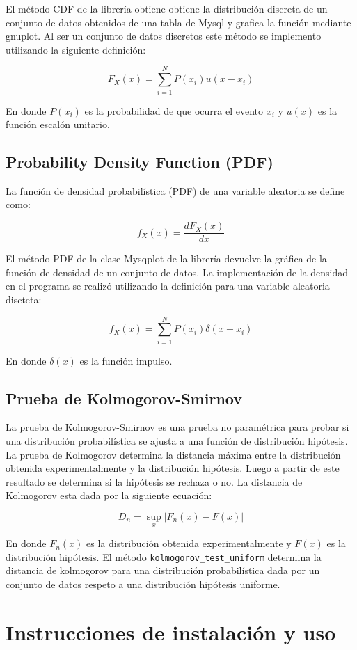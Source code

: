 \documentclass[a4paper]{article}
\begin{document}
El método CDF de la librería obtiene obtiene la distribución discreta de un conjunto de datos obtenidos de una tabla de Mysql y grafica la función mediante gnuplot. Al ser un conjunto de datos discretos este método se implemento utilizando la siguiente definición:

$$ F_X(x) = \sum_{i=1}^N P(x_i)u(x-x_i) $$

En donde $P(x_i)$ es la probabilidad de que ocurra el evento $x_i$ y $u(x)$ es la función escalón unitario.

\subsection{Probability Density Function (PDF)}

La función de densidad probabilística (PDF) de una variable aleatoria se define como:

$$ f_X(x) = \frac{dF_X(x)}{dx} $$

El método PDF de la clase Mysqplot de la librería devuelve la gráfica de la función de densidad de un conjunto de datos. La implementación de la densidad en el programa se realizó utilizando la definición para una variable aleatoria discteta:

$$ f_X(x) = \sum_{i=1}^N P(x_i)\delta(x-x_i) $$

En donde $\delta(x)$ es la función impulso. 

\subsection{Prueba de Kolmogorov-Smirnov}

La prueba de Kolmogorov-Smirnov es una prueba no paramétrica para probar si una distribución probabilística se ajusta a una función de distribución hipótesis. La prueba de Kolmogorov determina la distancia máxima entre la distribución obtenida experimentalmente y la distribución hipótesis. Luego a partir de este resultado se determina si la hipótesis se rechaza o no. La distancia de Kolmogorov esta dada por la siguiente ecuación:

$$ D_n = \sup_x{|F_n(x)-F(x)|} $$

En donde $F_n(x)$ es la distribución obtenida experimentalmente y $F(x)$ es la distribución hipótesis. El método \texttt{kolmogorov\_test\_uniform} determina la distancia de kolmogorov para una distribución probabilística dada por un conjunto de datos respeto a una distribución hipótesis uniforme.

\section{Instrucciones de instalación y uso}
\end{document}
